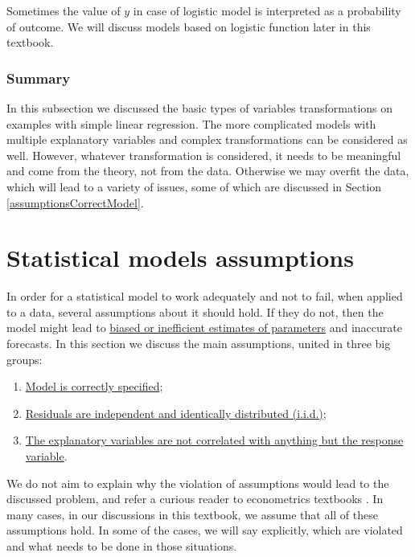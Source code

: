 \documentclass[
]{book}
\providecommand{\tightlist}{%
  \setlength{\itemsep}{0pt}\setlength{\parskip}{0pt}}
\theoremstyle{definition}
\theoremstyle{definition}
\theoremstyle{definition}
\theoremstyle{definition}
\theoremstyle{remark}
\begin{document}
Sometimes the value of \(y\) in case of logistic model is interpreted as a probability of outcome. We will discuss models based on logistic function later in this textbook.

\hypertarget{summary}{%
\subsection{Summary}\label{summary}}

In this subsection we discussed the basic types of variables transformations on examples with simple linear regression. The more complicated models with multiple explanatory variables and complex transformations can be considered as well. However, whatever transformation is considered, it needs to be meaningful and come from the theory, not from the data. Otherwise we may overfit the data, which will lead to a variety of issues, some of which are discussed in Section \ref{assumptionsCorrectModel}.

\hypertarget{assumptions}{%
\chapter{Statistical models assumptions}\label{assumptions}}

In order for a statistical model to work adequately and not to fail, when applied to a data, several assumptions about it should hold. If they do not, then the model might lead to \protect\hyperlink{estimatesProperties}{biased or inefficient estimates of parameters} and inaccurate forecasts. In this section we discuss the main assumptions, united in three big groups:

\begin{enumerate}
\def\labelenumi{\arabic{enumi}.}
\tightlist
\item
  \protect\hyperlink{assumptionsCorrectModel}{Model is correctly specified};
\item
  \protect\hyperlink{assumptionsResidualsAreIID}{Residuals are independent and identically distributed (i.i.d.)};
\item
  \protect\hyperlink{assumptionsXreg}{The explanatory variables are not correlated with anything but the response variable}.
\end{enumerate}

We do not aim to explain why the violation of assumptions would lead to the discussed problem, and refer a curious reader to econometrics textbooks \citep[for example][]{Hanck2020}. In many cases, in our discussions in this textbook, we assume that all of these assumptions hold. In some of the cases, we will say explicitly, which are violated and what needs to be done in those situations.
\end{document}

